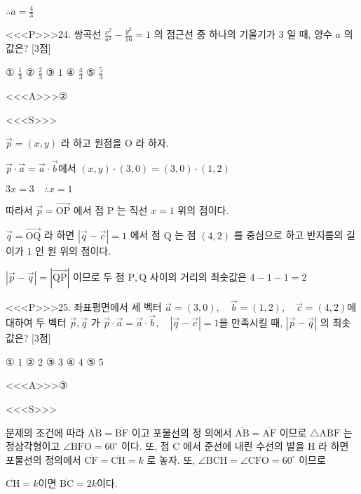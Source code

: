 \documentclass{oblivoir}
\begin{document}
$\therefore a=\frac{4}{3}$


<<<P>>>24. 쌍곡선 $\frac{x^{2}}{a^{2}}-\frac{y^{2}}{16}=1$ 의 점근선 중 하나의 기울기가 3 일 때, 양수 $a$ 의 값은? [3점]

① $\frac{1}{3}$
② $\frac{2}{3}$
③ $1$
④ $\frac{4}{3}$
⑤ $\frac{5}{3}$


<<<A>>>②

<<<S>>>



$ \overrightarrow{p}=(x, y)$ 라 하고 원점을 $\mathrm{O}$ 라 하자.

$\overrightarrow{p} \cdot \overrightarrow{a}=\overrightarrow{a} \cdot \overrightarrow{b}$에서 $(x, y) \cdot(3,0)=(3,0) \cdot(1,2)$

$3 x=3 \quad \therefore x=1$

따라서 $\overrightarrow{p}=\overrightarrow{\mathrm{OP}}$ 에서 점 $\mathrm{P}$ 는 직선 $x=1$ 위의 점이다.

$\overrightarrow{q}=\overrightarrow{\mathrm{OQ}}$ 라 하면 $|\overrightarrow{q}-\overrightarrow{c}|=1$ 에서 점 $\mathrm{Q}$ 는 점 $(4,2)$ 를 중심으로 하고 반지름의 길이가 1 인 원 위의 점이다.

$|\overrightarrow{p}-\overrightarrow{q}|=|\overrightarrow{\mathrm{QP}}|$ 이므로 두 점 $\mathrm{P}, \mathrm{Q}$ 사이의 거리의 최솟값은 $4-1-1=2$


<<<P>>>25. 좌표평면에서 세 벡터 $\overrightarrow{a}=(3,0), \quad \overrightarrow{b}=(1,2), \quad \overrightarrow{c}=(4,2)$에 대하여 두 벡터 $\overrightarrow{p}, \overrightarrow{q}$ 가
$\overrightarrow{p} \cdot \overrightarrow{a}=\overrightarrow{a} \cdot \overrightarrow{b}, \quad|\overrightarrow{q}-\overrightarrow{c}|=1$을 만족시킬 때, $|\overrightarrow{p}-\overrightarrow{q}|$ 의 최솟값은? [3점]

① $1$
② $2$
③ $3$
④ $4$
⑤ $5$



<<<A>>>③

<<<S>>>



문제의 조건에 따라 $\overline{\mathrm{AB}}=\overline{\mathrm{BF}}$ 이고 포물선의 정 의에서 $\overline{\mathrm{AB}}=\overline{\mathrm{AF}}$ 이므로 $\triangle \mathrm{ABF}$ 는 정삼각형이고 $\angle \mathrm{BFO}=60^{\circ}$ 이다.
또, 점 $\mathrm{C}$ 에서 준선에 내린 수선의 발을 $\mathrm{H}$ 라 하면 포물선의 정의에서 $\overline{\mathrm{CF}}=\overline{\mathrm{CH}}=k$ 로 놓자.
또, $\angle \mathrm{BCH}=\angle \mathrm{CFO}=60^{\circ}$ 이므로

$\overline{\mathrm{CH}}=k$이면 $\overline{\mathrm{BC}}=2 k$이다.
\end{document}

